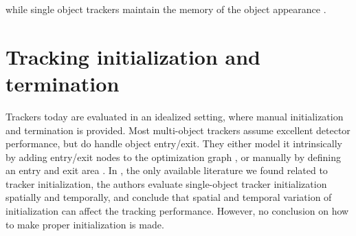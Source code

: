 while single object trackers maintain the memory of the object appearance \cite{kalal2012tracking}.

\section{Tracking initialization and termination}
Trackers today are evaluated in an idealized setting, where manual initialization and termination is provided.
Most multi-object trackers assume excellent detector performance, but do handle object entry/exit. They either model it intrinsically by adding entry/exit nodes to the optimization graph
\cite{zhang2008global}, 
or manually by defining an entry and exit area
\cite{andriyenko2011multi}.
In \cite{Wu_2013_CVPR}, 
the only available literature we found related to tracker initialization, 
the authors evaluate single-object tracker initialization spatially and temporally, and conclude that spatial and temporal variation of initialization can affect the tracking performance. However, no conclusion on how to make proper initialization is made.

